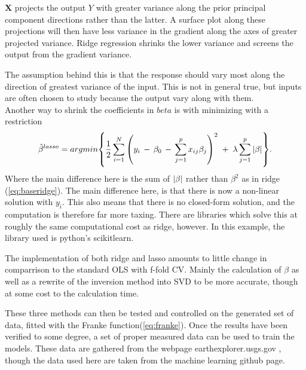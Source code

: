 \documentclass[ 12pt, a4paper ]{article}
\begin{document}
$\mathbf{X}$ projects the output $Y$ with greater variance along the prior principal component
directions rather than the latter. A surface plot along these projections will then have less 
variance in the gradient along the axes of greater projected variance. Ridge regression shrinks 
the lower variance and screens the output from the gradient variance.

The assumption behind this is that the response should vary most along the direction of greatest
variance of the input. This is not in general true, but inputs are often chosen to study because 
the output vary along with them.\\

Another way to shrink the coefficients in $beta$ is with minimizing with a restriction 
\begin{align}
    \hat{\beta}^{lasso} = argmin\qty{ 
        \frac{1}{2}\sum_{i=1}^N \qty(y_i \,-\, \beta_0 \,-\, \sum_{j=1}^p x_{ij}\beta_j)^2
        \;+\; \lambda\sum_{j=1}^p \abs{\beta}  }.\label{eq:baselasso}
\end{align}
Where the main difference here is the sum of $\abs{\beta}$ rather than $\beta^2$ as in ridge
(\ref{eq:baseridge}). The main difference here, is that there is now a non-linear solution with
$y_i$. This also means that there is no closed-form solution, and the computation is therefore 
far more taxing. There are libraries which solve this at roughly the same computational cost as 
ridge, however. In this example, the library used is python's scikitlearn.

The implementation of both ridge and lasso amounts to little change in comparrison to the 
standard OLS with f-fold CV. Mainly the calculation of $\beta$ as well as a rewrite of the 
inversion method into SVD to be more accurate, though at some cost to the calculation time. 

These three methods can then be tested and controlled on the generated set of data, fitted with
the Franke function(\ref{eq:franke}). Once the results have been verified to some degree, a set
of proper measured data can be used to train the models. These data are gathered from the 
webpage earthexplorer.usgs.gov
, though the data used here are taken from the machine learning
github page. 
\end{document}
